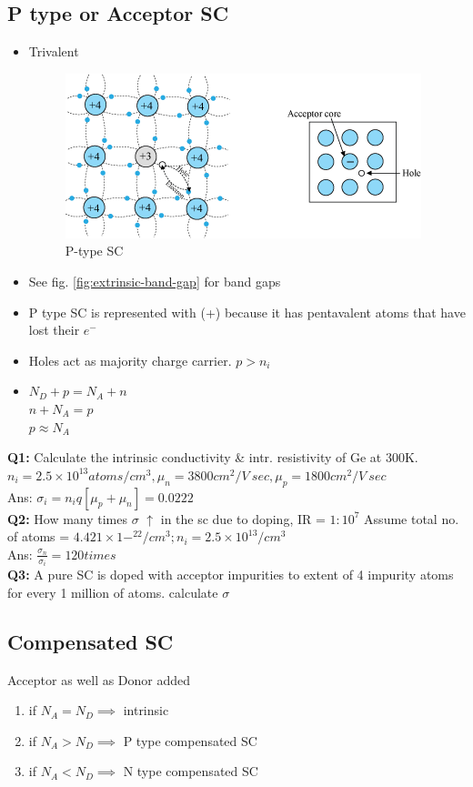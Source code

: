 \documentclass[10pt, a4paper]{report}
\begin{document}
	\subsection{P type or Acceptor SC}
	\begin{itemize}
	\item Trivalent
	\begin{figure}[h]
		\centering
		\includegraphics[width=0.7\linewidth]{img/p_type}
		\caption{P-type SC}
		\label{fig:ptype}
	\end{figure}
	
	\item See fig. \ref{fig:extrinsic-band-gap} for band gaps
	\item P type SC is represented with (+) because it has pentavalent atoms that have lost their $ e^- $
	\item Holes act as majority charge carrier. $ p>n_i $
	\item $ N_D + p = N_A + n $ \\ $ n + N_A = p $ \\ $ p \approx N_A $
	\end{itemize}
	\textbf{Q1:} Calculate the intrinsic conductivity \& intr. resistivity of Ge at 300K. $ n_i = 2.5 \times  10^{13} atoms/cm^3,\mu_n = 3800 cm^2/V\: sec, \mu_p = 1800 cm^2/V\: sec $ \\
	Ans: 
	$\sigma_i = n_i q [\mu_p + \mu_n] = 0.0222 $\\
	\textbf{Q2:} How many times $\sigma$ $\uparrow$ in the sc due to doping, IR = $ 1:10^7 $ Assume total no. of atoms = $ 4.421 \times 1-^{22} /cm^3 ; n_i = 2.5 \times 10^{13} / cm^3$\\
	Ans: 
	$ \frac{\sigma_n}{\sigma_i} = 120 times $\\
	\textbf{Q3:} A pure SC is doped with acceptor impurities to extent of 4 impurity atoms for every 1 million of atoms. calculate $\sigma$\\
	
	\subsection{Compensated SC} Acceptor as well as Donor added
	\begin{enumerate}
		\item if $ N_A = N_D \implies $ intrinsic
		\item if $ N_A > N_D \implies $ P type compensated SC
		\item if $ N_A < N_D \implies $ N type compensated SC
	\end{enumerate}
\end{document}
